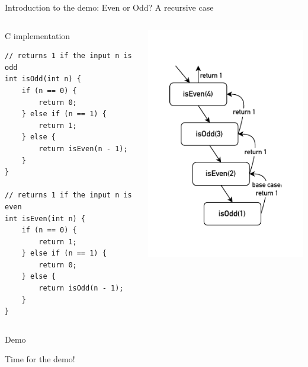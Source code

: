 \documentclass[aspectratio=1610,10.5pt]{beamer} %
\begin{document}
\begin{frame}[fragile]{Introduction to the demo: Even or Odd? A recursive case}
    \begin{columns}
        \begin{column}{0.55\textwidth}
            \vspace{-0.5cm}
            \begin{block}{C implementation}
                    \begin{verbatim}
// returns 1 if the input n is odd
int isOdd(int n) {
    if (n == 0) {
        return 0;
    } else if (n == 1) {
        return 1;
    } else {
        return isEven(n - 1);
    }
}

// returns 1 if the input n is even
int isEven(int n) {
    if (n == 0) {
        return 1;
    } else if (n == 1) {
        return 0;
    } else {
        return isOdd(n - 1);
    }
}
                    \end{verbatim}
            \end{block}
        \end{column}
        \begin{column}{0.40\textwidth}
            \includegraphics[width=%
            0.65\textheight]{../res/diagram-parity}
        \end{column}
    \end{columns}
\end{frame}

\begin{frame}{Demo}
    \begin{center}
        {\LARGE Time for the demo!}
    \end{center}
\end{frame}
\end{document}
